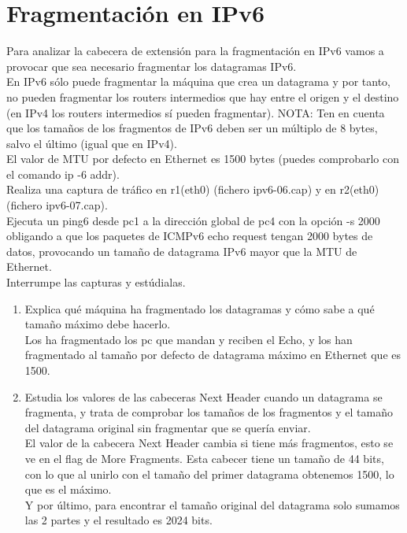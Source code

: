 \documentclass[12pt, a4paper]{report}
\begin{document}
\chapter{Fragmentación en IPv6}
Para analizar la cabecera de extensión para la fragmentación en IPv6 vamos a provocar que sea
necesario fragmentar los datagramas IPv6.\\

En IPv6 sólo puede fragmentar la máquina que crea un datagrama y por tanto, no pueden fragmentar los routers intermedios que hay entre el origen y el destino (en IPv4 los routers intermedios
sí pueden fragmentar). NOTA: Ten en cuenta que los tamaños de los fragmentos de IPv6 deben ser
un múltiplo de 8 bytes, salvo el último (igual que en IPv4).\\

El valor de MTU por defecto en Ethernet es 1500 bytes (puedes comprobarlo con el comando
ip -6 addr).\\


Realiza una captura de tráfico en r1(eth0) (fichero ipv6-06.cap) y en r2(eth0) (fichero
ipv6-07.cap).\\

Ejecuta un ping6 desde pc1 a la dirección global de pc4 con la opción -s 2000 obligando a
que los paquetes de ICMPv6 echo request tengan 2000 bytes de datos, provocando un tamaño de
datagrama IPv6 mayor que la MTU de Ethernet.\\

Interrumpe las capturas y estúdialas.
\begin{enumerate}
	\item Explica qué máquina ha fragmentado los datagramas y cómo sabe a qué tamaño máximo debe
	hacerlo.\\
	
	Los ha fragmentado los pc que mandan y reciben el Echo, y los han fragmentado al tamaño por defecto de datagrama máximo en Ethernet que es 1500.
	\item Estudia los valores de las cabeceras Next Header cuando un datagrama se fragmenta, y trata
	de comprobar los tamaños de los fragmentos y el tamaño del datagrama original sin fragmentar
	que se quería enviar.\\
	
	El valor de la cabecera Next Header cambia si tiene más fragmentos, esto se ve en el flag de More Fragments. Esta cabecer tiene un tamaño de 44 bits, con lo que al unirlo con el tamaño del primer datagrama obtenemos 1500, lo que es el máximo.\\
	Y por último, para encontrar el tamaño original del datagrama solo sumamos las 2 partes y el resultado es 2024 bits.
\end{enumerate}
\end{document}

